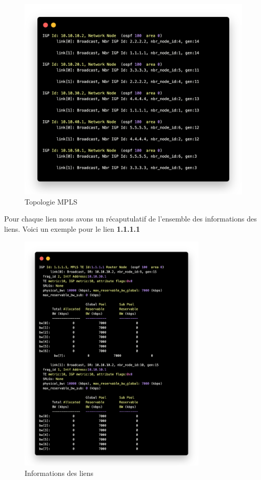 \documentclass[12pt, a4paper]{article}
\begin{document}
\begin{figure}[h]
    \centering
    \includegraphics[width=1\textwidth]{img/code1.png}
    \caption{Topologie MPLS}
    \label{fig:script1}
\end{figure}
\newpage
Pour chaque lien nous avons un récaputulatif de l'ensemble des informations des liens.
Voici un exemple pour le lien \textbf{1.1.1.1}
\begin{figure}[h]
    \centering
    \includegraphics[width=0.8\textwidth]{img/code2.png}
    \caption{Informations des liens}
    \label{fig:script2}
\end{figure}
\end{document}
